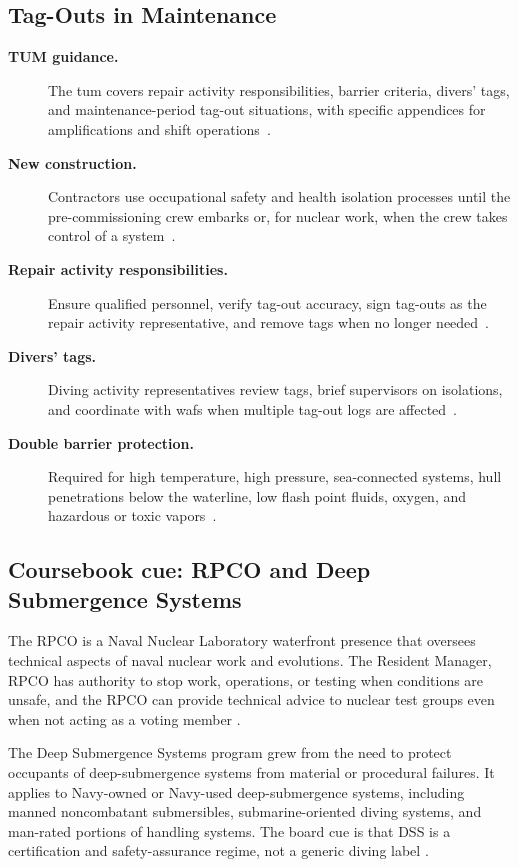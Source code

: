 \documentclass[../main.tex]{subfiles}
\begin{document}
\subsection{Tag-Outs in Maintenance}
\begin{description}
  \item[\textbf{TUM guidance.}] The \ac{tum} covers repair activity responsibilities, barrier criteria, divers' tags, and maintenance-period tag-out situations, with specific appendices for amplifications and shift operations~\autocite{edo-4-1-5-waterfront-work-control-2025,S0400-AD-URM-010}.
  \item[\textbf{New construction.}] Contractors use occupational safety and health isolation processes until the pre-commissioning crew embarks or, for nuclear work, when the crew takes control of a system~\autocite{edo-4-1-5-waterfront-work-control-2025}.
  \item[\textbf{Repair activity responsibilities.}] Ensure qualified personnel, verify tag-out accuracy, sign tag-outs as the repair activity representative, and remove tags when no longer needed~\autocite{edo-4-1-5-waterfront-work-control-2025}.
  \item[\textbf{Divers' tags.}] Diving activity representatives review tags, brief supervisors on isolations, and coordinate with \acp{waf} when multiple tag-out logs are affected~\autocite{edo-4-1-5-waterfront-work-control-2025}.
  \item[\textbf{Double barrier protection.}] Required for high temperature, high pressure, sea-connected systems, hull penetrations below the waterline, low flash point fluids, oxygen, and hazardous or toxic vapors~\autocite{edo-4-1-5-waterfront-work-control-2025}.
\end{description}

\subsection{Coursebook cue: RPCO and Deep Submergence Systems}

The RPCO is a Naval Nuclear Laboratory waterfront presence that oversees
technical aspects of naval nuclear work and evolutions.  The Resident Manager,
RPCO has authority to stop work, operations, or testing when conditions are
unsafe, and the RPCO can provide technical advice to nuclear test groups even
when not acting as a voting member
\autocite{edo-4-1-5-waterfront-work-control-2025}.

The Deep Submergence Systems program grew from the need to protect occupants of
deep-submergence systems from material or procedural failures.  It applies to
Navy-owned or Navy-used deep-submergence systems, including manned
noncombatant submersibles, submarine-oriented diving systems, and man-rated
portions of handling systems.  The board cue is that DSS is a certification and
safety-assurance regime, not a generic diving label
\autocite{edo-4-1-5-waterfront-work-control-2025}.
\end{document}
